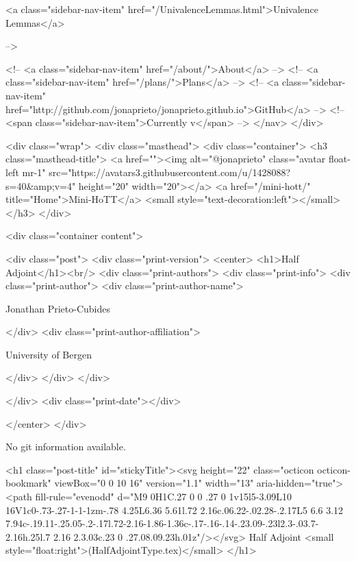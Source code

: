           <a class="sidebar-nav-item" href="/UnivalenceLemmas.html">Univalence Lemmas</a>
        
      
     -->

    <!-- <a class="sidebar-nav-item" href="/about/">About</a> -->
    <!-- <a class="sidebar-nav-item" href="/plans/">Plans</a> -->
    <!-- <a class="sidebar-nav-item" href="http://github.com/jonaprieto/jonaprieto.github.io">GitHub</a> -->
    <!-- <span class="sidebar-nav-item">Currently v</span> -->
  </nav>
</div>

    <div class="wrap">
      <div class="masthead">
        <div class="container">
          <h3 class="masthead-title">
            <a href=""><img alt="@jonaprieto" class="avatar float-left mr-1" src="https://avatars3.githubusercontent.com/u/1428088?s=40&amp;v=4" height="20" width="20"></a>
            <a href="/mini-hott/" title="Home">Mini-HoTT</a>
            <small style="text-decoration:left"></small>
          </h3>
        </div>
      
      <div class="container content">
        







<div class="post">
  <div class="print-version">
    <center>
      <h1>Half Adjoint</h1><br/>
        <div class="print-authors">
          <div class="print-info">
            <div class="print-author">
              <div class="print-author-name">
                
                  Jonathan Prieto-Cubides
                
              </div>
              <div class="print-author-affiliation">
                
                  University of Bergen
                
                </div>
            </div>
          </div>
          
          
        </div>
        <div class="print-date"></div>
        
        
    </center>
  </div>

  
  No git information available.
  

  <h1 class="post-title" id="stickyTitle"><svg height="22" class="octicon octicon-bookmark" viewBox="0 0 10 16" version="1.1" width="13" aria-hidden="true"><path fill-rule="evenodd" d="M9 0H1C.27 0 0 .27 0 1v15l5-3.09L10 16V1c0-.73-.27-1-1-1zm-.78 4.25L6.36 5.61l.72 2.16c.06.22-.02.28-.2.17L5 6.6 3.12 7.94c-.19.11-.25.05-.2-.17l.72-2.16-1.86-1.36c-.17-.16-.14-.23.09-.23l2.3-.03.7-2.16h.25l.7 2.16 2.3.03c.23 0 .27.08.09.23h.01z"/></svg> Half Adjoint <small style="float:right">(HalfAdjointType.tex)</small>
  </h1>

